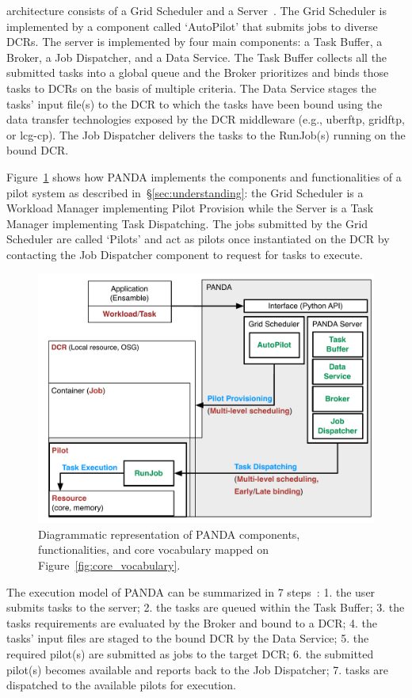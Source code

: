 \documentclass{sig-alternate}
\begin{document}
\panda architecture consists of a Grid Scheduler and a \panda
Server~\cite{panda_architecture_url,maeno2011overview}. The Grid Scheduler is
implemented by a component called `AutoPilot' that submits jobs to diverse DCRs.
The \panda server is implemented by four main components: a Task Buffer, a
Broker, a Job Dispatcher, and a Data Service. The Task Buffer collects all the
submitted tasks into a global queue and the Broker prioritizes and binds those
tasks to DCRs on the basis of multiple criteria. The Data Service stages the
tasks' input file(s) to the DCR to which the tasks have been bound using the
data transfer technologies exposed by the DCR middleware (e.g., uberftp,
gridftp, or lcg-cp). The Job Dispatcher delivers the tasks to the RunJob(s)
running on the bound DCR.

Figure~\ref{fig:panda_comparison} shows how PANDA implements the components and
functionalities of a pilot system as described in~\S\ref{sec:understanding}: the
Grid Scheduler is a Workload Manager implementing Pilot Provision while the
\panda Server is a Task Manager implementing Task Dispatching. The jobs
submitted by the Grid Scheduler are called `Pilots' and act as pilots once
instantiated on the DCR by contacting the Job Dispatcher component to request
for tasks to execute.

\begin{figure}[t]
    \centering
        \includegraphics[width=.48\textwidth]{figures/panda_comparison.pdf}
    \caption{Diagrammatic representation of PANDA components, functionalities,
    and core vocabulary mapped on Figure~\ref{fig:core_vocabulary}.}
    \label{fig:panda_comparison}
\end{figure}

The execution model of PANDA can be summarized in 7
steps~\cite{nilsson2011atlas,pandarun_url}: 1. the user submits tasks to the
\panda server; 2. the tasks are queued within the Task Buffer; 3. the tasks
requirements are evaluated by the Broker and bound to a DCR; 4. the tasks' input
files are staged to the bound DCR by the Data Service; 5. the required pilot(s)
are submitted as jobs to the target DCR; 6. the submitted pilot(s) becomes
available and reports back to the Job Dispatcher; 7. tasks are dispatched to the
available pilots for execution.
\end{document}
